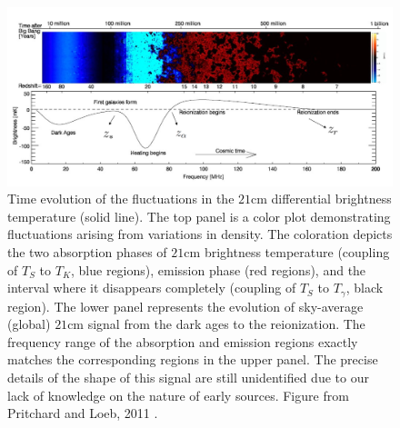 \documentclass[12pt, TexShade, letterpaper]{report}
\begin{document}
\begin{figure}[h!]
\centering
\includegraphics[scale =0.5]{global_signal_pritchard_loeb.png}
\caption[Time evolution of the fluctuations in the $\mathrm{21cm}$ differential brightness temperature]{Time evolution of the fluctuations in the $\mathrm{21cm}$ differential brightness temperature (solid line). The top panel is a color plot demonstrating fluctuations arising from variations in density. The coloration depicts the two absorption phases of $\mathrm{21cm}$ brightness temperature (coupling of $T_S$ to $T_K$, blue regions), emission phase (red regions), and the interval where it disappears completely (coupling of $T_S$ to $T_\gamma$, black region). The lower panel represents the evolution of sky-average (global) $\mathrm{21cm}$ signal from the dark ages to the reionization. The frequency range of the absorption and emission regions exactly matches the corresponding regions in the upper panel. The precise details of the shape of this signal are still unidentified due to our lack of knowledge on the nature of early sources\cite{liu2013global}. Figure from Pritchard and Loeb, 2011 \cite{21century}.}
\label{fig:global_signal_pritchard_loeb}
\end{figure}
\end{document}
